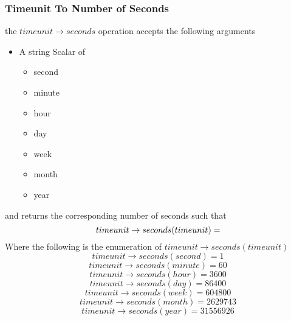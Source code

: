\documentclass[../main.tex]{subfiles}
\begin{document}
\subsubsection{Timeunit To Number of Seconds}
the $timeunit \to seconds$ operation accepts the following arguments

\begin{itemize}
\item A string Scalar of
  \begin{itemize}
  \item second
  \item minute
  \item hour
  \item day
  \item week
  \item month
  \item year
  \end{itemize}
\end{itemize}
and returns the corresponding number of seconds such that
$$timeunit \to seconds(timeunit) = \real$$
Where the following is the enumeration of $timeunit \to seconds(timeunit)$
$$timeunit \to seconds(second) = 1$$
$$timeunit \to seconds(minute) = 60$$
$$timeunit \to seconds(hour) = 3600$$
$$timeunit \to seconds(day) = 86400$$
$$timeunit \to seconds(week) = 604800$$
$$timeunit \to seconds(month) = 2629743$$
$$timeunit \to seconds(year) = 31556926$$
\end{document}
